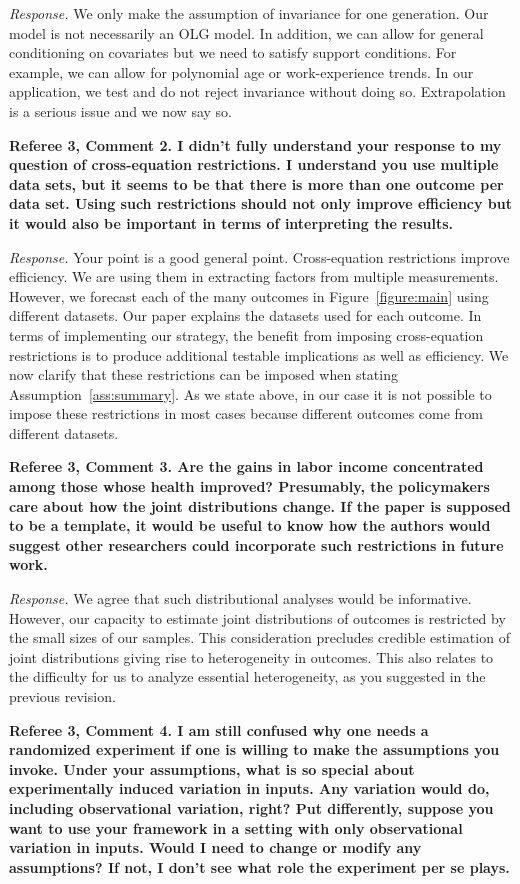 \noindent \textit{Response.} We only make the assumption of invariance for one generation. Our model is not necessarily an OLG model. In addition, we can allow for general conditioning on covariates but we need to satisfy support conditions. For example, we can allow for polynomial age or work-experience trends. In our application, we test and do not reject invariance without doing so. Extrapolation is a serious issue and we now say so.

\noindent \textbf{Referee 3, Comment 2. I didn't fully understand your response to my question of cross-equation restrictions. I understand you use multiple data sets, but it seems to be that there is more than one outcome per data set. Using such restrictions should not only improve efficiency but it would also be important in terms of interpreting the results.} 

\noindent \textit{Response.} Your point is a good general point. Cross-equation restrictions improve efficiency. We are using them in extracting factors from multiple measurements. However, we forecast each of the many outcomes in Figure~\ref{figure:main} using different datasets. Our paper explains the datasets used for each outcome. In terms of implementing our  strategy, the benefit from imposing cross-equation restrictions is to produce additional testable implications as well as efficiency. We now clarify that these restrictions can be imposed when stating Assumption~\ref{ass:summary}. As we state above, in our case it is not possible to impose these restrictions in most cases because different outcomes come from different datasets. 

\noindent \textbf{Referee 3, Comment 3. Are the gains in labor income concentrated among those whose health improved? Presumably, the policymakers care about how the joint distributions change. If the paper is supposed to be a template, it would be useful to know how the authors would suggest other researchers could incorporate such restrictions in future work.}

\noindent \textit{Response.} We agree that such distributional analyses would be informative. However, our capacity to estimate joint distributions of outcomes is restricted by the small sizes of our samples. This consideration precludes credible estimation of joint distributions giving rise to heterogeneity in outcomes. This also relates to the difficulty for us to analyze essential heterogeneity, as you suggested in the previous revision.

\noindent \textbf{Referee 3, Comment 4. I am still confused why one needs a randomized experiment if one is willing to make the assumptions you invoke. Under your assumptions, what is so special about experimentally induced variation in inputs. Any variation would do, including observational variation, right? Put differently, suppose you want to use your framework in a setting with only observational variation in inputs. Would I need to change or modify any assumptions? If not, I don't see what role the experiment per se plays.}

